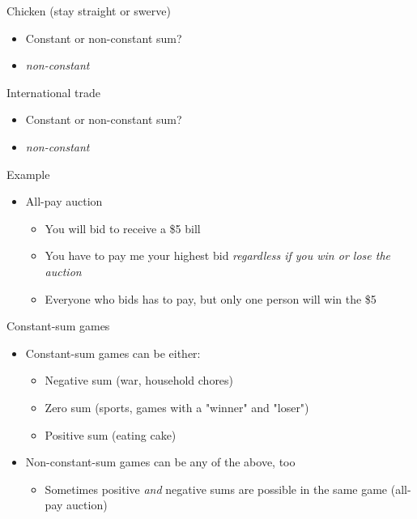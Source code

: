 \documentclass[10pt]{beamer}
\begin{document}
\begin{frame}[label={sec:org86c765e}]{}
\alert{Chicken (stay straight or swerve)}
\begin{itemize}
\item Constant or non-constant sum?
\end{itemize}
\begin{itemize}
\item \emph{non-constant}
\end{itemize}
\end{frame}

\begin{frame}[label={sec:org99550ff}]{}
\alert{International trade}
\begin{itemize}
\item Constant or non-constant sum?
\end{itemize}
\begin{itemize}
\item \emph{non-constant}
\end{itemize}
\end{frame}

\begin{frame}[label={sec:org79e1c9f}]{}
\alert{Example}
\begin{itemize}
\item All-pay auction
\begin{itemize}
\item You will bid to receive a \$5 bill
\item You have to pay me your highest bid \emph{regardless if you win or lose the auction}
\item Everyone who bids has to pay, but only one person will win the \$5
\end{itemize}
\end{itemize}
\end{frame}

\begin{frame}[label={sec:org30825c8}]{}
\alert{Constant-sum games}
\begin{itemize}
\item Constant-sum games can be either:
\begin{itemize}
\item Negative sum (war, household chores)
\item Zero sum (sports, games with a "winner" and "loser")
\item Positive sum (eating cake)
\end{itemize}
\item Non-constant-sum games can be any of the above, too
\begin{itemize}
\item Sometimes positive \emph{and} negative sums are possible in the same game (all-pay auction)
\end{itemize}
\end{itemize}
\end{frame}
\end{document}
